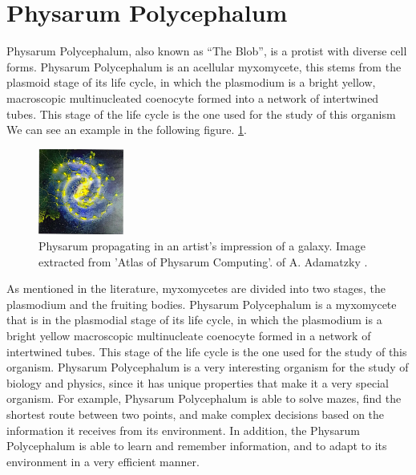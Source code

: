 \documentclass[conference]{IEEEtran}
\begin{document}
\section{Physarum Polycephalum}
\label{sec:physarum}
    Physarum Polycephalum, also known as “The Blob”, is a protist with diverse cell forms. 
        Physarum Polycephalum is an acellular myxomycete, this stems from the plasmoid stage of its life cycle, 
        in which the plasmodium is a bright yellow, macroscopic multinucleated coenocyte formed into a network of 
        intertwined tubes. This stage of the life cycle is the one used for the study of this organism \cite{Stephenson1994} 
        We can see an example in the following figure. \ref{fig:PhysarumPolycephalum01}.
    \begin{figure}[htbp]
        \centerline{\includegraphics[width=0.25\textwidth]{./images/PhyrasumPolycephalum01.png}}
        \caption{Physarum propagating in an artist's impression of a galaxy. Image extracted from 'Atlas of Physarum Computing'. of A. Adamatzky \cite{Adamatzky2014}.}
        \label{fig:PhysarumPolycephalum01}    
    \end{figure} 
    \vskip 0.2cm
    As mentioned in the literature, myxomycetes are divided into two stages, the plasmodium and the fruiting bodies. Physarum Polycephalum 
        is a myxomycete that is in the plasmodial stage of its life cycle, in which the plasmodium is a bright yellow macroscopic multinucleate 
        coenocyte formed in a network of intertwined tubes. This stage of the life cycle is the one used for the study of this organism.\cite{Stephenson1994}
    \vskip 0.2cm
    Physarum Polycephalum is a very interesting organism for the study of biology and physics, since it has unique properties 
        that make it a very special organism. For example, Physarum Polycephalum is able to solve mazes, 
        find the shortest route between two points, and make complex decisions based on the 
        information it receives from its environment. In addition, the Physarum Polycephalum is able to learn and remember 
        information, and to adapt to its environment in a very efficient manner.
\end{document}
